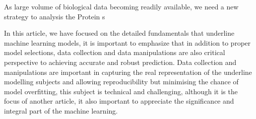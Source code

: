 As large volume of biological data becoming readily available, we need a new strategy to analysis the Protein s
\par
In this article, we have focused on the detailed fundamentals that underline machine learning models, it is important to emphasize that in addition to proper model selections, data collection and data manipulations are also critical perspective to achieving accurate and robust prediction. Data collection and manipulations are important in capturing the real representation of the underline modelling subjects and allowing reproducibility but minimising the chance of model overfitting, this subject is technical and challenging, although it is the focus of another article, it also important to appreciate the significance and integral part of the machine learning. 
\par 
